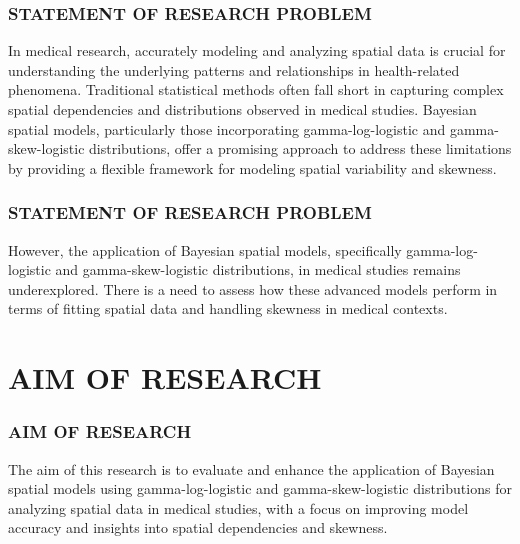 \documentclass{beamer}
\begin{document}
\begin{frame}
		\frametitle{\textbf{STATEMENT OF RESEARCH PROBLEM}}
		
		In medical research, accurately modeling and analyzing spatial data is crucial for understanding the underlying patterns and relationships in health-related phenomena. Traditional statistical methods often fall short in capturing complex spatial dependencies and distributions observed in medical studies. Bayesian spatial models, particularly those incorporating gamma-log-logistic and gamma-skew-logistic distributions, offer a promising approach to address these limitations by providing a flexible framework for modeling spatial variability and skewness. 
		
	\end{frame}




\begin{frame}
		\frametitle{\textbf{STATEMENT OF RESEARCH PROBLEM}}
		However, the application of Bayesian spatial models, specifically gamma-log-logistic and gamma-skew-logistic distributions, in medical studies remains underexplored. There is a need to assess how these advanced models perform in terms of fitting spatial data and handling skewness in medical contexts. 
		
	\end{frame}


\section{AIM OF RESEARCH}
\begin{frame}
		\frametitle{\textbf{AIM OF RESEARCH}}
		The aim of this research is to evaluate and enhance the application of Bayesian spatial models using gamma-log-logistic and gamma-skew-logistic distributions for analyzing spatial data in medical studies, with a focus on improving model accuracy and insights into spatial dependencies and skewness.
		
	\end{frame}

\end{document}
